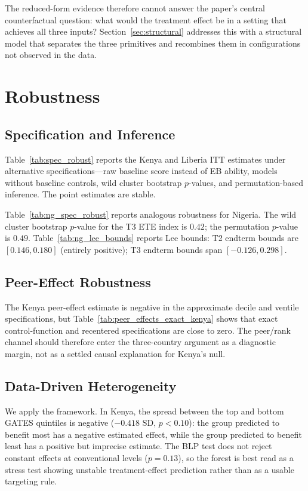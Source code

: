 \documentclass[11pt]{article}
\begin{document}
The reduced-form evidence therefore cannot answer the paper's central counterfactual question: what would the treatment effect be in a setting that achieves all three inputs? Section~\ref{sec:structural} addresses this with a structural model that separates the three primitives and recombines them in configurations not observed in the data.


\section{Robustness}
\label{sec:robustness}

\subsection{Specification and Inference}

Table~\ref{tab:spec_robust} reports the Kenya and Liberia ITT estimates under alternative specifications---raw baseline score instead of EB ability, models without baseline controls, wild cluster bootstrap $p$-values, and permutation-based inference. The point estimates are stable.

Table~\ref{tab:ng_spec_robust} reports analogous robustness for Nigeria. The wild cluster bootstrap $p$-value for the T3 ETE index is $0.42$; the permutation $p$-value is $0.49$. Table~\ref{tab:ng_lee_bounds} reports Lee bounds: T2 endterm bounds are $[0.146, 0.180]$ (entirely positive); T3 endterm bounds span $[-0.126, 0.298]$.

\subsection{Peer-Effect Robustness}

The Kenya peer-effect estimate is negative in the approximate decile and ventile specifications, but Table~\ref{tab:peer_effects_exact_kenya} shows that exact control-function and recentered specifications are close to zero. The peer/rank channel should therefore enter the three-country argument as a diagnostic margin, not as a settled causal explanation for Kenya's null.

\subsection{Data-Driven Heterogeneity}

We apply the \cite{chernozhukov2025fisher} framework. In Kenya, the spread between the top and bottom GATES quintiles is negative ($-0.418$ SD, $p < 0.10$): the group predicted to benefit most has a negative estimated effect, while the group predicted to benefit least has a positive but imprecise estimate. The BLP test does not reject constant effects at conventional levels ($p = 0.13$), so the forest is best read as a stress test showing unstable treatment-effect prediction rather than as a usable targeting rule.
\end{document}
